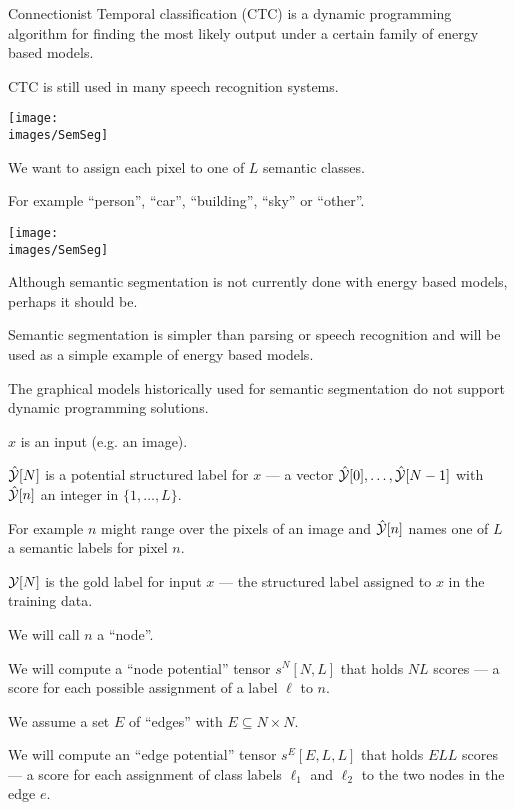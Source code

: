 {\vfill
Connectionist Temporal classification (CTC) is a dynamic programming algorithm for finding the most likely output under a certain family of energy based models.

\vfill
CTC is still used in many speech recognition systems.

\centerline{\texttt{[image: \\images/SemSeg]}}

\vfill
We want to assign each pixel to one of $L$ semantic classes.

\vfill
For example ``person'', ``car'', ``building'', ``sky'' or ``other''.


\centerline{\texttt{[image: \\images/SemSeg]}}

\vfill
Although semantic segmentation is not currently done with energy based models, perhaps it should be.

\vfill
Semantic segmentation is simpler than parsing or speech recognition and will be used as a simple example of energy based models.

\vfill
The graphical models historically used for semantic segmentation do not support dynamic programming solutions.


$x$ is an input (e.g. an image).

\vfill
$\hat{\cal Y} [N]$ is a potential structured label for $x$ --- a vector $\hat{\cal Y}[0],\ldots,\hat{\cal Y}[N-1]$ with $\hat{\cal Y}[n]$ an integer in $\{1,\ldots,L\}$.

\vfill
For example $n$ might range over the pixels of an image and $\hat{\cal Y}[n]$ names one of $L$ a semantic labels for pixel $n$.

\vfill
${\cal Y}[N]$ is the gold label for input $x$ --- the structured label assigned to $x$ in the training data.




We will call $n$ a ``node''.

\vfill
We will compute a ``node potential'' tensor {\color{red} $s^N[N,L]$} that holds $NL$ scores --- a score for each possible assignment of a label $\ell$ to $n$.

\vfill
We assume a set $E$ of ``edges'' with $E \subseteq N \times N$.

\vfill
We will compute an ``edge potential'' tensor {\color{red} $s^E[E,L,L]$} that holds $ELL$ scores --- a score for each assignment of class labels $\ell_1$ and $\ell_2$
to the two nodes in the edge $e$.


}
